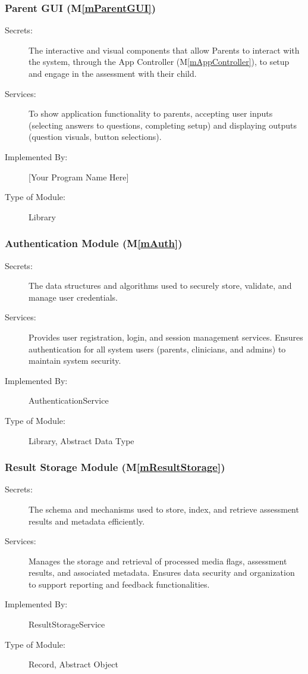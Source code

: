 \documentclass[12pt, titlepage]{article}
\newcommand{\mref}[1]{M\ref{#1}}
\begin{document}
\subsubsection{Parent GUI (\mref{mParentGUI})}

\begin{description}
\item[Secrets:]The interactive and visual components that allow Parents to interact with the system, through the App Controller (\mref{mAppController}),
               to setup and engage in the assessment with their child.
\item[Services:] To show application functionality to parents, accepting user inputs (selecting answers to questions,
                 completing setup) and displaying outputs (question visuals, button selections).
\item[Implemented By:] [Your Program Name Here]
\item[Type of Module:] Library
\end{description}

\subsubsection{Authentication Module (\mref{mAuth})}

\begin{description}
\item[Secrets:] The data structures and algorithms used to securely store, validate, and manage user credentials.
\item[Services:] Provides user registration, login, and session management services. Ensures authentication for all system users (parents, clinicians, and admins) to maintain system security.
\item[Implemented By:] AuthenticationService
\item[Type of Module:] Library, Abstract Data Type
\end{description}

\subsubsection{Result Storage Module (\mref{mResultStorage})}

\begin{description}
\item[Secrets:] The schema and mechanisms used to store, index, and retrieve assessment results and metadata efficiently.
\item[Services:] Manages the storage and retrieval of processed media flags, assessment results, and associated metadata. Ensures data security and organization to support reporting and feedback functionalities.
\item[Implemented By:] ResultStorageService
\item[Type of Module:] Record, Abstract Object
\end{description}
\end{document}
